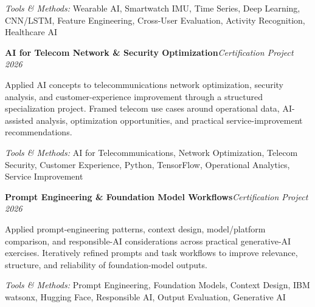 \documentclass[10pt,letterpaper]{extarticle}
\newcommand{\entry}[2]{\Needspace{4\baselineskip}\textbf{#1}\hfill\textit{#2}\par}
\begin{document}
{\small\textit{Tools \& Methods:} Wearable AI, Smartwatch IMU, Time Series, Deep Learning, CNN/LSTM, Feature Engineering, Cross-User Evaluation, Activity Recognition, Healthcare AI\par}
\vspace{1pt}
\entry{AI for Telecom Network \& Security Optimization}{Certification Project \textbar{} 2026}
Applied AI concepts to telecommunications network optimization, security analysis, and customer-experience improvement through a structured specialization project. Framed telecom use cases around operational data, AI-assisted analysis, optimization opportunities, and practical service-improvement recommendations.\par
{\small\textit{Tools \& Methods:} AI for Telecommunications, Network Optimization, Telecom Security, Customer Experience, Python, TensorFlow, Operational Analytics, Service Improvement\par}
\vspace{1pt}
\entry{Prompt Engineering \& Foundation Model Workflows}{Certification Project \textbar{} 2026}
Applied prompt-engineering patterns, context design, model/platform comparison, and responsible-AI considerations across practical generative-AI exercises. Iteratively refined prompts and task workflows to improve relevance, structure, and reliability of foundation-model outputs.\par
{\small\textit{Tools \& Methods:} Prompt Engineering, Foundation Models, Context Design, IBM watsonx, Hugging Face, Responsible AI, Output Evaluation, Generative AI\par}
\vspace{1pt}
\end{document}
